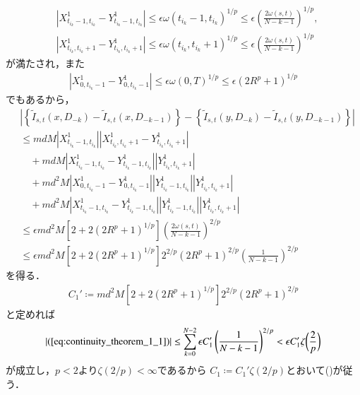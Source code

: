 \begin{prf}
\begin{description}
\begin{align}
					&\left| X^1_{t_{i_k}-1,t_{i_k}} - Y^1_{t_{i_k}-1,t_{i_k}} \right| \leq \epsilon \omega(t_{i_k}-1,t_{i_k})^{1/p} \leq \epsilon \left( \frac{2\omega(s,t)}{N-k-1} \right)^{1/p}, \\
					&\left| X^1_{t_{i_k},t_{i_k}+1} - Y^1_{t_{i_k},t_{i_k}+1} \right| \leq \epsilon \omega(t_{i_k},t_{i_k}+1)^{1/p} \leq \epsilon \left( \frac{2\omega(s,t)}{N-k-1} \right)^{1/p}
				\end{align}
				が満たされ，また
				\begin{align}
					\left| X^1_{0,t_{i_k}-1} - Y^1_{0,t_{i_k}-1} \right|
					\leq \epsilon \omega(0,T)^{1/p}
					\leq \epsilon \left( 2 R^p + 1 \right)^{1/p}
				\end{align}
				でもあるから，
				\begin{align}
					&\left| \left\{ \tilde{I}_{s,t}(x,D_{-k}) - \tilde{I}_{s,t}(x,D_{-k-1}) \right\} - 
						\left\{ \tilde{I}_{s,t}(y,D_{-k}) - \tilde{I}_{s,t}(y,D_{-k-1}) \right\} \right| \\
					&\leq md M \left|X^1_{t_{i_k}-1,t_{i_k}}\right|\left| X^1_{t_{i_k},t_{i_k}+1} - Y^1_{t_{i_k},t_{i_k}+1} \right| \\
						&\quad + md M \left| X^1_{t_{i_k}-1,t_{i_k}} - Y^1_{t_{i_k}-1,t_{i_k}} \right| \left| Y^1_{t_{i_k},t_{i_k}+1} \right| \\
						&\quad + md^2 M \left| X^1_{0,t_{i_k}-1} - Y^1_{0,t_{i_k}-1} \right| \left| Y^1_{t_{i_k}-1,t_{i_k}} \right|\left| Y^1_{t_{i_k},t_{i_k}+1} \right| \\
						&\quad + md^2 M \left| X^1_{t_{i_k}-1,t_{i_k}} - Y^1_{t_{i_k}-1,t_{i_k}} \right| \left| Y^1_{t_{i_k}-1,t_{i_k}} \right|\left| Y^1_{t_{i_k},t_{i_k}+1} \right| \\
					&\leq \epsilon md^2M \left[2 + 2 \left( 2 R^p + 1 \right)^{1/p} \right] \left( \frac{2\omega(s,t)}{N-k-1} \right)^{2/p} \\
					&\leq \epsilon md^2M \left[2 + 2 \left( 2 R^p + 1 \right)^{1/p} \right] 2^{2/p} \left( 2 R^p + 1 \right)^{2/p} \left( \frac{1}{N-k-1} \right)^{2/p}
				\end{align}
				を得る．
				\begin{align}
					C_1' \coloneqq  md^2M \left[2 + 2 \left( 2 R^p + 1 \right)^{1/p} \right] 2^{2/p} \left( 2 R^p + 1 \right)^{2/p}
				\end{align}
				と定めれば
				\begin{align}
					|(\refeq{eq:continuity_theorem_1_1})| \leq
					\sum_{k=0}^{N-2} \epsilon C_1' \left( \frac{1}{N-k-1} \right)^{2/p}
					< \epsilon C_1' \zeta \biggl( \frac{2}{p} \biggr)
				\end{align}
				が成立し，$p < 2$より$\zeta(2/p) < \infty$であるから
				$C_1 \coloneqq C_1' \zeta(2/p)$とおいて()が従う．
			

\end{description}
\end{prf}
